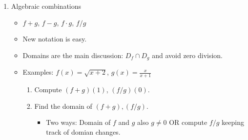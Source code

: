 \documentclass{article}
\begin{document}
\begin{enumerate}
\item Algebraic combinations
\begin{itemize}
\item $f+g$, \quad $f-g$, \quad $f\cdot g$, \quad $f/g$
\item New notation is easy.
\item Domains are the main discussion: $D_f \cap D_g$ and avoid zero division.
\item Examples: $f(x)=\sqrt{x+2}$, $g(x) = \frac{x}{x+1}$
\begin{enumerate}
\item Compute $(f+g)(1)$, $(f/g)(0)$.
\item Find the domain of $(f+g), (f/g)$. 
\begin{itemize}
\item Two ways: Domain of $f$ and $g$ also $g\neq 0$ OR compute $f/g$ keeping track of domian changes.
\end{itemize}
\end{enumerate}
\end{itemize}


\end{enumerate}
\end{document}
